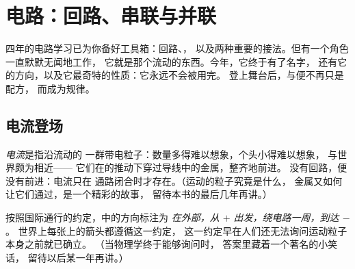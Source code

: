 \chapter{电路：回路、串联与并联}\label{ch:g7:circuits-series-parallel}

四年的电路学习已为你备好工具箱：回路、，
以及两种重要的接法。但有一个角色一直默默无闻地工作，
它就是那个流动的东西。今年，它终于有了名字，
还有它的方向，以及它最奇特的性质：它永远不会被用完。
登上舞台后，与便不再只是配方，
而成为规律。

\section{电流登场}

\begin{definition}[电流]\label{def:g7:circuits-series-parallel:current}
\emph{电流}是指沿流动的
一群带电粒子：数量多得难以想象，个头小得难以想象，
与世界颇为相近——
它们在的推动下穿过导线中的金属，整齐地前进。
没有回路，便没有前进：电流只在
通路闭合时才存在。（运动的粒子究竟是什么，
金属又如何让它们通过，是一个精彩的故事，
留待本书的最后几年再讲。）
\end{definition}

\begin{proposition}[约定的方向]\label{prop:g7:circuits-series-parallel:direction}
按照国际通行的约定，中的方向标注为
\emph{在外部，从 $+$ 出发，绕电路一周，到达 $-$ }。
世界上每张上的箭头都遵循这一约定，
这一约定早在人们还无法询问运动粒子本身之前就已确立。
（当物理学终于能够询问时，
答案里藏着一个著名的小笑话，
留待以后某一年再讲。）
\end{proposition}

